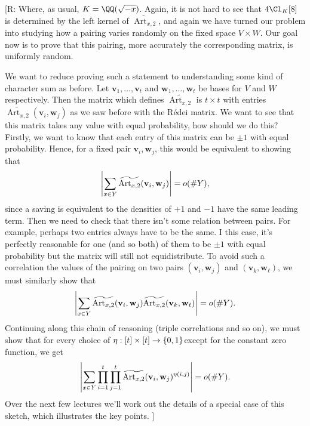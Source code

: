\documentclass{lecturenotes}
\newcommand{\ross}[1]{{\color{red}[R:#1]}}
\newcommand{\Art}{\operatorname{Art}}
\newcommand{\bv}{\mathbf{v}}
\newcommand{\bw}{\mathbf{w}}
\numberwithin{equation}{section}
\begin{document}
\ross{
Where, as usual, $K=\QQ(\sqrt{-x})$.  Again, it is not hard to see that $4\Cl_K[8]$ is determined by the left kernel of $\widetilde{\Art_{x,2}}$, and again we have turned our problem into studying how a pairing varies randomly on the fixed space $V\times W$.  Our goal now is to prove that this pairing, more accurately the corresponding matrix, is uniformly random.



We want to reduce proving such a statement to understanding some kind of character sum as before.  Let $\bv_1,\dots,\bv_t$ and $\bw_1,\dots,\bw_t$ be bases for $V$ and $W$ respectively.  Then the matrix which defines $\widetilde{\Art_{x,2}}$ is $t\times t$ with entries $\widetilde{\Art_{x,2}}(\bv_i,\bw_j)$ as we saw before with the R\'edei matrix.  We want to see that this matrix takes any value with equal probability, how should we do this?  Firstly, we want to know that each entry of this matrix can be $\pm 1$ with equal probability.  Hence, for a fixed pair $\bv_i,\bw_j$, this would be equivalent to showing that
\[\abs{\sum_{x\in Y}\widetilde{\Art_{x,2}}(\bv_i,\bw_j)}=o(\#Y),\]
since a saving is equivalent to the densities of $+1$ and $-1$ have the same leading term.  Then we need to check that there isn't some relation between pairs.  For example, perhaps two entries always have to be the same.  I this case, it's perfectly reasonable for one (and so both) of them to be $\pm 1$ with equal probability but the matrix will still not equidistribute.  To avoid such a correlation the values of the pairing on two pairs $(\bv_i,\bw_j)$ and $(\bv_k,\bw_\ell)$, we must similarly show that 
\[\abs{\sum_{x\in Y}\widetilde{\Art_{x,2}}(\bv_{i},\bw_j)\widetilde{\Art_{x,2}}(\bv_k,\bw_{\ell})}=o(\#Y).\]
Continuing along this chain of reasoning (triple correlations and so on), we must show that for every choice of $\eta:[t]\times[t]\to \left\{{0,1}\right\}$except for the constant zero function, we get 
\[\abs{\sum_{x\in Y}\prod_{i=1}^t\prod_{j=1}^t\widetilde{\Art_{x,2}}(\bv_{i},\bw_j)^{\eta(i,j)}}=o(\#Y).\]
Over the next few lectures we'll work out the details of a special case of this sketch, which illustrates the key points.
}
\end{document}
